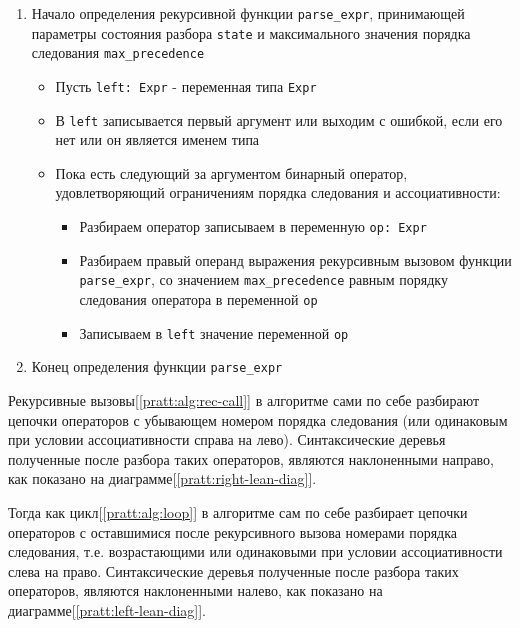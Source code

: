 \begin{enumerate}
    \item Начало определения рекурсивной функции \verb|parse_expr|, 
    принимающей параметры состояния разбора \verb|state| и максимального значения порядка следования \verb|max_precedence|

    \begin{itemize}
        \item Пусть \verb|left: Expr| - переменная типа \verb|Expr|

        \item В \verb|left| записывается первый аргумент или выходим с ошибкой, если его нет или он является именем типа

        \item\label{pratt:alg:loop} Пока есть следующий за аргументом бинарный оператор, удовлетворяющий ограничениям порядка следования и ассоциативности:

        \begin{itemize}
            \item Разбираем оператор записываем в переменную \verb|op: Expr|

            \item\label{pratt:alg:rec-call} Разбираем правый операнд выражения рекурсивным вызовом функции \verb|parse_expr|, 
            со значением \verb|max_precedence| равным порядку следования оператора в переменной \verb|op|

            \item Записываем в \verb|left| значение переменной \verb|op|
        \end{itemize}
    \end{itemize}

    \item Конец определения функции \verb|parse_expr|
\end{enumerate}


Рекурсивные вызовы[\ref{pratt:alg:rec-call}] в алгоритме сами по себе разбирают цепочки операторов с убывающем номером порядка следования
(или одинаковым при условии ассоциативности справа на лево). 
Синтаксические деревья полученные после разбора таких операторов, являются наклоненными направо, как показано на диаграмме[\ref{pratt:right-lean-diag}].

Тогда как цикл[\ref{pratt:alg:loop}] в алгоритме сам по себе разбирает цепочки операторов с оставшимися после рекурсивного вызова номерами порядка следования, 
т.е. возрастающими или одинаковыми при условии ассоциативности слева на право. 
Синтаксические деревья полученные после разбора таких операторов, являются наклоненными налево, как показано на диаграмме[\ref{pratt:left-lean-diag}].


